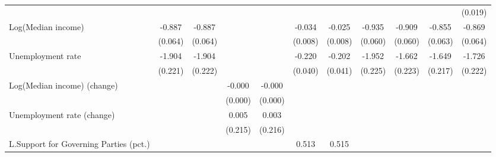 \begin{sidewaystable}[htbp]
\begin{tabular}{l*{10}{c}}
                    &                    &                    &                    &                    &                    &                    &                    &                    &                    &     (0.019)        \\
[1em]
Log(Median income)  &      -0.887\sym{**}&      -0.887\sym{**}&                    &                    &      -0.034\sym{**}&      -0.025\sym{**}&      -0.935\sym{**}&      -0.909\sym{**}&      -0.855\sym{**}&      -0.869\sym{**}\\
                    &     (0.064)        &     (0.064)        &                    &                    &     (0.008)        &     (0.008)        &     (0.060)        &     (0.060)        &     (0.063)        &     (0.064)        \\
[1em]
Unemployment rate   &      -1.904\sym{**}&      -1.904\sym{**}&                    &                    &      -0.220\sym{**}&      -0.202\sym{**}&      -1.952\sym{**}&      -1.662\sym{**}&      -1.649\sym{**}&      -1.726\sym{**}\\
                    &     (0.221)        &     (0.222)        &                    &                    &     (0.040)        &     (0.041)        &     (0.225)        &     (0.223)        &     (0.217)        &     (0.222)        \\
[1em]
Log(Median income) (change)&                    &                    &      -0.000\sym{**}&      -0.000\sym{**}&                    &                    &                    &                    &                    &                    \\
                    &                    &                    &     (0.000)        &     (0.000)        &                    &                    &                    &                    &                    &                    \\
[1em]
Unemployment rate (change)&                    &                    &       0.005        &       0.003        &                    &                    &                    &                    &                    &                    \\
                    &                    &                    &     (0.215)        &     (0.216)        &                    &                    &                    &                    &                    &                    \\
[1em]
L.Support for Governing Parties (pct.)&                    &                    &                    &                    &       0.513\sym{**}&       0.515\sym{**}&                    &                    &                    &                    \\

\end{tabular}
\end{sidewaystable}
